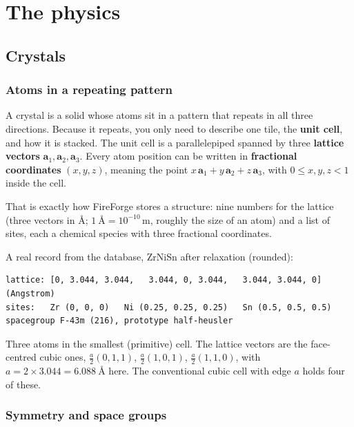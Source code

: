 \documentclass[11pt,a4paper]{report}
\begin{document}
\part{The physics}

\chapter{Crystals}

\section{Atoms in a repeating pattern}

A crystal is a solid whose atoms sit in a pattern that repeats in all three directions.
Because it repeats, you only need to describe one tile, the \textbf{unit cell}, and how it
is stacked. The unit cell is a parallelepiped spanned by three \textbf{lattice vectors}
$\mathbf a_1,\mathbf a_2,\mathbf a_3$. Every atom position can be written in
\textbf{fractional coordinates} $(x,y,z)$, meaning the point
$x\,\mathbf a_1+y\,\mathbf a_2+z\,\mathbf a_3$, with $0\le x,y,z<1$ inside the cell.

That is exactly how FireForge stores a structure: nine numbers for the lattice (three
vectors in \si{\angstrom}; $\SI{1}{\angstrom}=10^{-10}\,\mathrm{m}$, roughly the size of an
atom) and a list of sites, each a chemical species with three fractional coordinates.

\begin{inff}
A real record from the database, ZrNiSn after relaxation (rounded):
\begin{lstlisting}
lattice: [0, 3.044, 3.044,   3.044, 0, 3.044,   3.044, 3.044, 0]   (Angstrom)
sites:   Zr (0, 0, 0)   Ni (0.25, 0.25, 0.25)   Sn (0.5, 0.5, 0.5)
spacegroup F-43m (216), prototype half-heusler
\end{lstlisting}
Three atoms in the smallest (primitive) cell. The lattice vectors are the face-centred
cubic ones, $\tfrac a2(0,1,1)$, $\tfrac a2(1,0,1)$, $\tfrac a2(1,1,0)$, with
$a=2\times3.044=\SI{6.088}{\angstrom}$ here. The conventional cubic cell with edge $a$ holds four of these.
\end{inff}

\section{Symmetry and space groups}
\end{document}
